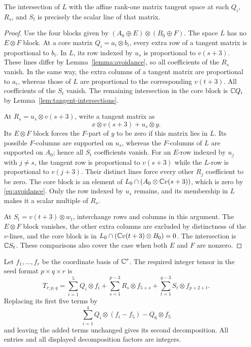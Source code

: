 \begin{lemma}\label{lemma:extended-tangencies}
The intersection of $L$ with the affine rank-one matrix tangent space
at each $Q_i$, $R_s$, and $S_t$ is precisely the scalar line of that
matrix.
\end{lemma}

\begin{proof}
Use the four blocks given by
$(A_0\oplus E)\otimes(B_0\oplus F)$. The space $L$ has no
$E\otimes F$ block.
At a core matrix $Q_i=a_i\otimes b_i$, every extra row of a tangent
matrix is proportional to $b_i$. In $L$, its row indexed by $u_s$
is proportional to $v(s+3)$. These lines differ by
Lemma~\ref{lemma:avoidance}, so all coefficients of the $R_s$ vanish.
In the same way, the extra columns of a tangent matrix are proportional
to $a_i$, whereas those of $L$ are proportional to the corresponding
$v(t+3)$. All coefficients of the $S_t$ vanish. The remaining
intersection in the core block is $\mathbb C Q_i$ by
Lemma~\ref{lem:tangent-intersections}.

At $R_s=u_s\otimes v(s+3)$, write a tangent matrix as
\[
 x\otimes v(s+3)+u_s\otimes y.
\]
Its $E\otimes F$ block forces the $F$-part of $y$ to be zero if this
matrix lies in $L$. Its possible $F$-columns are supported on $u_s$,
whereas the $F$-columns of $L$ are supported on $A_0$; hence all
$S_t$ coefficients vanish. For an $E$-row indexed by $u_j$ with
$j\ne s$, the tangent row is proportional to $v(s+3)$ while the
$L$-row is proportional to $v(j+3)$. Their distinct lines force every
other $R_j$ coefficient to be zero. The core block is an element of
$L_0\cap(A_0\otimes\mathbb C v(s+3))$, which is zero by
\eqref{eq:avoidance}. Only the row indexed by $u_s$ remains, and its
membership in $L$ makes it a scalar multiple of $R_s$.

At $S_t=v(t+3)\otimes w_t$, interchange rows and columns in this
argument. The $E\otimes F$ block vanishes, the other extra columns
are excluded by distinctness of the $v$-lines, and the core block is
in $L_0\cap(\mathbb C v(t+3)\otimes B_0)=0$. The intersection is
$\mathbb C S_t$. These comparisons also cover the case when both $E$ and
$F$ are nonzero.
\end{proof}

Let $f_1,\ldots,f_r$ be the coordinate basis of $\mathbb C^r$. The required
integer tensor in the seed format $p\times q\times r$ is
\begin{equation}\label{eq:uniform-witness}
 T_{r;p,q}=\sum_{i=1}^5Q_i\otimes f_i
       +\sum_{s=1}^{p-3}R_s\otimes f_{5+s}
       +\sum_{t=1}^{q-3}S_t\otimes f_{p+2+t}.
\end{equation}
Replacing its first five terms by
\begin{equation}\label{eq:uniform-second}
 \sum_{i=1}^4 Q_i\otimes(f_i-f_5)-Q_6\otimes f_5
\end{equation}
and leaving the added terms unchanged gives its second decomposition.
All entries and all displayed decomposition factors are integers.

